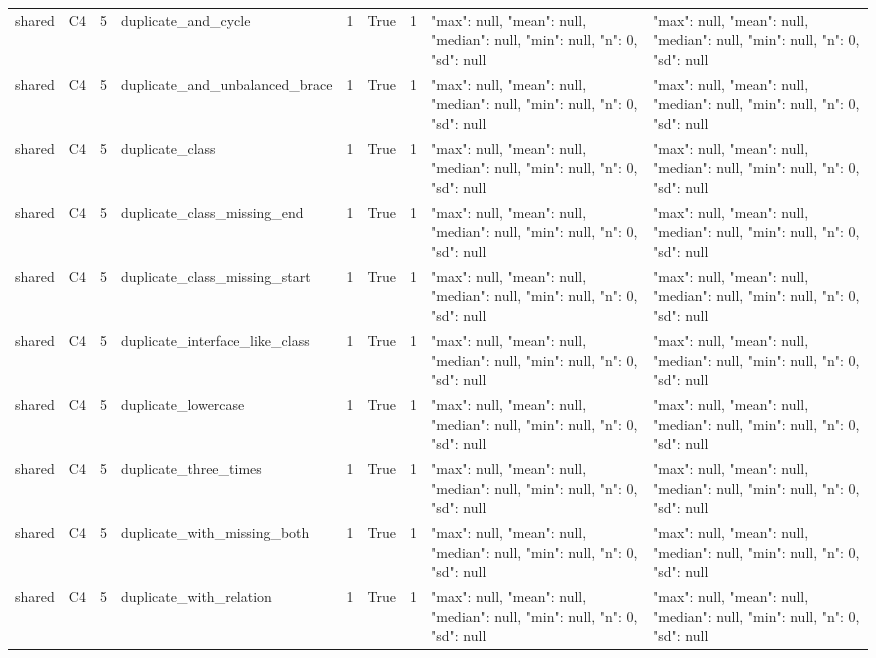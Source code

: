 \begin{tabular}{lllllllll}
shared & C4 & 5 & duplicate\_and\_cycle & 1 & True & 1 & {"max": null, "mean": null, "median": null, "min": null, "n": 0, "sd": null} & {"max": null, "mean": null, "median": null, "min": null, "n": 0, "sd": null} \\
shared & C4 & 5 & duplicate\_and\_unbalanced\_brace & 1 & True & 1 & {"max": null, "mean": null, "median": null, "min": null, "n": 0, "sd": null} & {"max": null, "mean": null, "median": null, "min": null, "n": 0, "sd": null} \\
shared & C4 & 5 & duplicate\_class & 1 & True & 1 & {"max": null, "mean": null, "median": null, "min": null, "n": 0, "sd": null} & {"max": null, "mean": null, "median": null, "min": null, "n": 0, "sd": null} \\
shared & C4 & 5 & duplicate\_class\_missing\_end & 1 & True & 1 & {"max": null, "mean": null, "median": null, "min": null, "n": 0, "sd": null} & {"max": null, "mean": null, "median": null, "min": null, "n": 0, "sd": null} \\
shared & C4 & 5 & duplicate\_class\_missing\_start & 1 & True & 1 & {"max": null, "mean": null, "median": null, "min": null, "n": 0, "sd": null} & {"max": null, "mean": null, "median": null, "min": null, "n": 0, "sd": null} \\
shared & C4 & 5 & duplicate\_interface\_like\_class & 1 & True & 1 & {"max": null, "mean": null, "median": null, "min": null, "n": 0, "sd": null} & {"max": null, "mean": null, "median": null, "min": null, "n": 0, "sd": null} \\
shared & C4 & 5 & duplicate\_lowercase & 1 & True & 1 & {"max": null, "mean": null, "median": null, "min": null, "n": 0, "sd": null} & {"max": null, "mean": null, "median": null, "min": null, "n": 0, "sd": null} \\
shared & C4 & 5 & duplicate\_three\_times & 1 & True & 1 & {"max": null, "mean": null, "median": null, "min": null, "n": 0, "sd": null} & {"max": null, "mean": null, "median": null, "min": null, "n": 0, "sd": null} \\
shared & C4 & 5 & duplicate\_with\_missing\_both & 1 & True & 1 & {"max": null, "mean": null, "median": null, "min": null, "n": 0, "sd": null} & {"max": null, "mean": null, "median": null, "min": null, "n": 0, "sd": null} \\
shared & C4 & 5 & duplicate\_with\_relation & 1 & True & 1 & {"max": null, "mean": null, "median": null, "min": null, "n": 0, "sd": null} & {"max": null, "mean": null, "median": null, "min": null, "n": 0, "sd": null} \\

\end{tabular}
